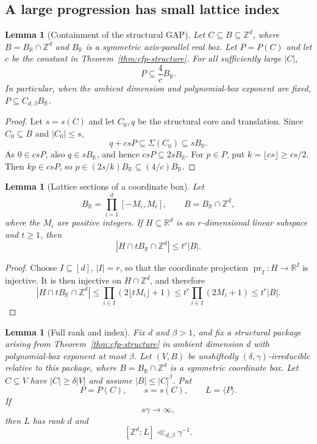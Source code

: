 \documentclass[11pt,reqno]{amsart}
\newtheorem{lemma}[theorem]{Lemma}
\theoremstyle{definition}
\theoremstyle{remark}
\newcommand{\Z}{\mathbb Z}
\newcommand{\R}{\mathbb R}
\newcommand{\SigmaSet}{\Sigma}
\begin{document}
\subsection{A large progression has small lattice index}

\begin{lemma}[Containment of the structural GAP]
\label{lem:gap-contained}
Let $C\subseteq B\subseteq\Z^d$, where $B=B_{\R}\cap\Z^d$ and $B_{\R}$ is a symmetric axis-parallel real box.  Let $P=P(C)$ and let $c$ be the constant in Theorem~\ref{thm:cfp-structure}.  For all sufficiently large $|C|$,
\[
 P\subseteq \frac{4}{c}B_{\R}.
\]
In particular, when the ambient dimension and polynomial-box exponent are fixed, $P\subseteq C_{d,\beta}B_{\R}$.
\end{lemma}

\begin{proof}
Let $s=s(C)$ and let $C_0,q$ be the structural core and translation.  Since
$C_0\subseteq B$ and $|C_0|\le s$,
\[
 q+csP\subseteq\SigmaSet(C_0)\subseteq sB_{\R}.
\]
As $0\in csP$, also $q\in sB_{\R}$, and hence $csP\subseteq2sB_{\R}$.
For $p\in P$, put $k=\lfloor cs\rfloor\ge cs/2$.  Then $kp\in csP$, so
$p\in(2s/k)B_{\R}\subseteq(4/c)B_{\R}$.
\end{proof}

\begin{lemma}[Lattice sections of a coordinate box]
\label{lem:lattice-section-box}
Let
\[
 B_{\R}=\prod_{i=1}^d[-M_i,M_i],
 \qquad
 B=B_{\R}\cap\Z^d,
\]
where the $M_i$ are positive integers.  If $H\subseteq\R^d$ is an
$r$-dimensional linear subspace and $t\ge1$, then
\[
 |H\cap tB_{\R}\cap\Z^d|\le t^r|B|.
\]
\end{lemma}

\begin{proof}
Choose $I\subseteq[d]$, $|I|=r$, so that the coordinate projection
$\operatorname{pr}_I:H\to\R^I$ is injective.  It is then injective on
$H\cap\Z^d$, and therefore
\[
 |H\cap tB_{\R}\cap\Z^d|
 \le\prod_{i\in I}(2\lfloor tM_i\rfloor+1)
 \le t^r\prod_{i\in I}(2M_i+1)\le t^r|B|.
\]
\end{proof}

\begin{lemma}[Full rank and index]
\label{lem:index-bound}
Fix $d$ and $\beta>1$, and fix a structural package arising from
Theorem~\ref{thm:cfp-structure} in ambient dimension $d$ with polynomial-box
exponent at most $\beta$.  Let $(V,B)$ be unshiftedly
$(\delta,\gamma)$-irreducible relative to this package, where
$B=B_{\R}\cap\Z^d$ is a symmetric coordinate box.  Let $C\subseteq V$
have $|C|\ge\delta|V|$ and assume $|B|\le|C|^\beta$.  Put
\[
 P=P(C),\qquad s=s(C),\qquad L=\langle P\rangle.
\]
If
\[
 s\gamma\longrightarrow\infty,
\]
then $L$ has rank $d$ and
\[
 [\Z^d:L]\ll_{d,\beta}\gamma^{-1}.
\]
\end{lemma}
\end{document}
